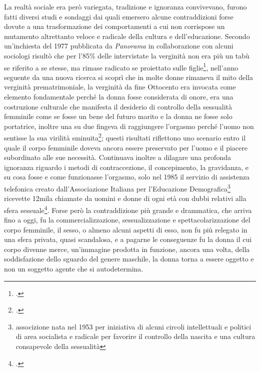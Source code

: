 La realtà sociale era però variegata, tradizione e ignoranza convivevano, furono fatti diversi studi e sondaggi dai quali emersero alcune contraddizioni forse dovute a una trasformazione dei comportamenti a cui non corrispose un mutamento altrettanto veloce e radicale della cultura e dell'educazione.
Secondo un'inchiesta del 1977 pubblicata da \textit{Panorama} in collaborazione con alcuni sociologi risultò che per l'85\% delle intervistate la verginità non era più un tabù se riferito a se stesse, ma rimase radicato se proiettato sulle figlie\footcite{Balestracci3}, nell'anno seguente da una nuova ricerca si scoprì che in molte donne rimaneva il mito della verginità prematrimoniale, la verginità da fine Ottocento era invocata come elemento fondamentale perché la donna fosse considerata di onore, era una costruzione culturale che manifesta il desiderio di controllo della sessualità femminile come se fosse un bene del futuro marito e la donna ne fosse solo portatrice, inoltre una su due fingeva di raggiungere l'orgasmo perché l'uomo non sentisse la sua virilità sminuita\footcite{Balestracci4}; questi risultati riflettono uno scenario entro il quale il corpo femminile doveva ancora essere preservato per l'uomo e il  piacere subordinato alle sue necessità.
Continuava inoltre a dilagare una profonda ignoranza riguardo i metodi di contraccezione, il concepimento, la gravidanza, e su cosa fosse e come funzionasse l'orgasmo, solo nel 1985 il servizio di assistenza telefonica creato dall'Associazione Italiana per l'Educazione Demografica\footnote{associzione nata nel 1953 per iniziativa di alcuni circoli intellettuali e politici di area socialista e radicale per favorire il controllo della nascita e una cultura consapevole della sessualità} ricevette 12mila chiamate da uomini e donne di ogni età con dubbi relativi alla sfera sessuale\footcite{Balestracci5}.
Forse però la contraddizione più grande e drammatica, che arriva fino a oggi, fu la commercializzazione, sessualizzazione e  spettacolarizzazione del corpo femminile, il sesso, o almeno alcuni aspetti di esso, non fu più relegato in una sfera privata, quasi scandalosa, e a pagarne le conseguenze fu la donna il cui corpo divenne merce, un'immagine prodotta in funzione, ancora una volta, della soddisfazione dello sguardo del genere maschile, la donna torna a essere oggetto e non un soggetto agente che si autodetermina. 
